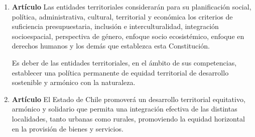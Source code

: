 \documentclass[11pt, a4paper]{article}
\begin{document}
\begin{enumerate}
\item \textbf{Artículo} \newline
Las entidades territoriales considerarán para su planificación social, política, administrativa, cultural, territorial y económica los criterios de suficiencia presupuestaria, inclusión e interculturalidad, integración socioespacial, perspectiva de género, enfoque socio ecosistémico, enfoque en derechos humanos y los demás que establezca esta Constitución. 

Es deber de las entidades territoriales, en el ámbito de sus competencias, establecer una política permanente de equidad territorial de desarrollo sostenible y armónico con la naturaleza. 


\item \textbf{Artículo} \newline
El Estado de Chile promoverá un desarrollo territorial equitativo, armónico y solidario que permita una integración efectiva de las distintas localidades, tanto urbanas como rurales, promoviendo la equidad horizontal en la provisión de bienes y servicios. 


\end{enumerate}
\end{document}
